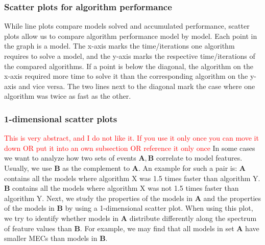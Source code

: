 \subsubsection*{Scatter plots for algorithm performance} \label{plot:performanceScatter}
While line plots compare models solved and accumulated performance, scatter plots allow us to compare algorithm performance model by model.
Each point in the graph is a model. The x-axis marks the time/iterations one algorithm requires to solve a model, and the y-axis marks the respective time/iterations of the compared algorithms.
If a point is below the diagonal, the algorithm on the x-axis required more time to solve it than the corresponding algorithm on the y-axis and vice versa.
The two lines next to the diagonal mark the case where one algorithm was twice as fast as the other.

\subsubsection*{1-dimensional scatter plots} \label{plot:1Dscatter}
\textcolor{red}{This is very abstract, and I do not like it. If you use it only once you can move it down OR put it into an own subsection OR reference it only once}
In some cases we want to analyze how two sets of events $\mathbf{A}, \mathbf{B}$ correlate to model features. 
Usually, we use $\mathbf{B}$ as the complement to $\mathbf{A}$.
An example for such a pair is: 
$\mathbf{A}$ contains all the models where algorithm X was 1.5 times faster than algorithm Y.
$\mathbf{B}$ contains all the models where algorithm X was not 1.5 times faster than algorithm Y.
Next, we study the properties of the models in $\mathbf{A}$ and the properties of the models in $\mathbf{B}$ 
by using a 1-dimensional scatter plot. When using this plot, we try to identify whether models in $\mathbf{A}$ distribute
differently along the spectrum of feature values than $\mathbf{B}$.
For example, we may find that all models in set $\mathbf{A}$ have smaller MECs than models in $\mathbf{B}$. 

